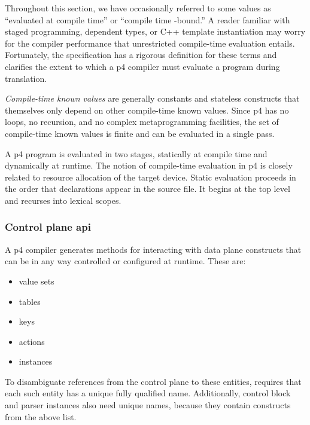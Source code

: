 Throughout this section, we have occasionally referred to some values as
``evaluated at compile time'' or ``compile time -bound.'' A reader familiar with staged programming,
dependent types, or C++ template instantiation may worry for the compiler
performance that unrestricted compile-time evaluation entails. Fortunately, the
\pfs specification has a rigorous definition for these terms and clarifies the
extent to which a \acrshort{p4} compiler must evaluate a program during
translation.

\emph{Compile-time known values} are generally constants and stateless
constructs that themselves only depend on other compile-time known values. Since
\acrshort{p4} has no loops, no recursion, and no complex metaprogramming
facilities, the set of compile-time known values is finite and can be evaluated
in a single pass.

A \acrshort{p4} program is evaluated in two stages, statically at compile time
and dynamically at runtime. The notion of compile-time evaluation in
\acrshort{p4} is closely related to resource allocation of the target device.
Static evaluation proceeds in the order that declarations appear in the source
file. It begins at the top level and recurses into lexical scopes.


\subsubsection*{Control plane \acrshort{api}}

A \acrshort{p4} compiler generates methods for interacting with data plane
constructs that can be in any way controlled or configured at runtime. These are:

\begin{itemize}
	\item value sets
	\item tables
	\item keys
	\item actions
	\item \extern instances
\end{itemize}

To disambiguate references from the control plane to these entities, \pfs
requires that each such entity has a unique fully qualified name. Additionally,
control block and parser instances also need unique names, because they contain
constructs from the above list.

